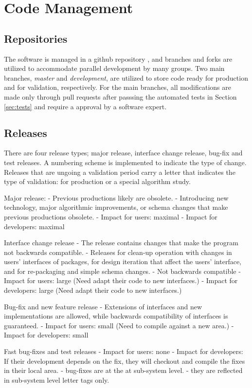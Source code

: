 \documentclass[3p,times,twocolumn]{elsarticle}
\begin{document}
\section{Code Management}

\subsection{Repositories}
The software is managed in a github repository \cite{recon-github}, and branches and forks are utilized to accommodate parallel development by many groups.  Two main branches, {\it master} and {\it development}, are utilized to store code ready for production and for validation, respectively. For the main branches, all modifications are made only through pull requests after passsing the automated tests in Section \ref{sec:tests} and require a approval by a software expert.

\subsection{Releases}
There are four release types; major release, interface change release, bug-fix
and test releases.  A numbering scheme is implemented to indicate the type of change.
Releases that are ungoing a validation period carry a letter that indicates the type of validation:
for production or a special algorithm study.

Major release:
- Previous productions likely are obsolete.
- Introducing new technology, major algorithmic improvements, or
schema changes that make previous productions obsolete.
- Impact for users: maximal
- Impact for developers: maximal

Interface change release
- The release contains changes that make the program not backwards compatible.
- Releases for clean-up operation with changes in users' interfaces of
packages, for design iteration that affect the users' interface, and
for re-packaging and simple schema changes.
- Not backwards compatible
- Impact for users: large (Need adapt their code to new interfaces.)
- Impact for developers: large (Need adapt their code to new interfaces.)

Bug-fix and new feature release
- Extensions of interfaces and new implementations are allowed, while
backwards compatibility of interfaces is guaranteed.
- Impact for users: small (Need to compile against a new area.)
- Impact for developers: small

Fast bug-fixes and test releases
- Impact for users: none
- Impact for developers: If their development depends on the fix, they will checkout
and compile the fixes in their local area.
- bug-fixes are at the at sub-system level.
- they are reflected in sub-system level letter tags only.
\end{document}
